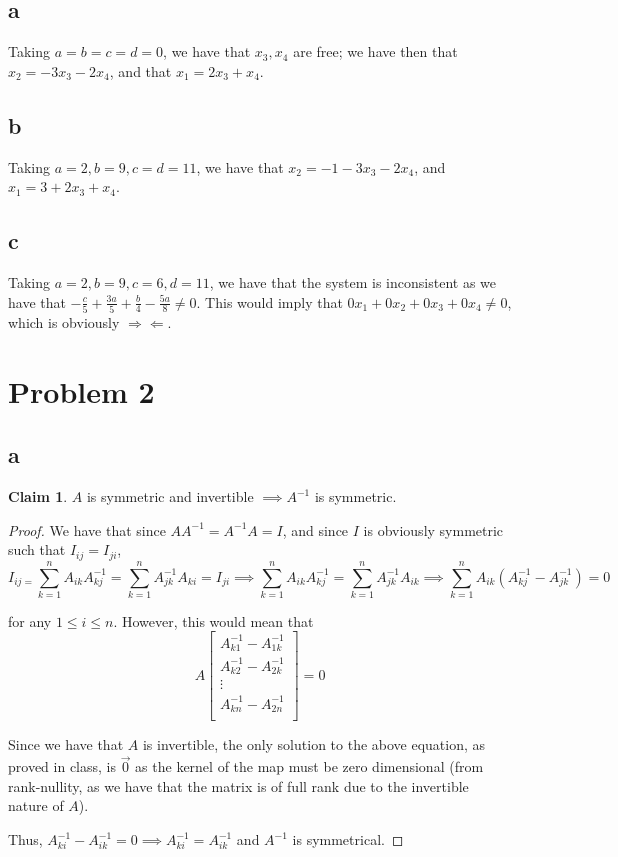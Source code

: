 \documentclass[12pt,letterpaper]{article}
\theoremstyle{definition}
\newtheorem*{claim}{Claim}
\newcommand{\contra}{\Rightarrow\!\Leftarrow}
\begin{document}
\subsection*{a}

Taking $a = b = c = d = 0$, we have that $x_3, x_4$ are free; we have then that
$x_2 = -3x_3 - 2x_4$, and that $x_1 = 2x_3 + x_4$.

\subsection*{b}

Taking $a = 2, b = 9, c = d = 11$, we have that $x_2 = -1 - 3x_3 - 2x_4$, and
$x_1 = 3 + 2x_3 + x_4$.

\subsection*{c}

Taking $a = 2, b = 9, c = 6, d = 11$, we have that the system is inconsistent as
we have that $-\frac{c}{5} + \frac{3a}{5} + \frac{b}{4} - \frac{5a}{8} \neq 0$.
This would imply that $0x_1 + 0x_2 + 0x_3 + 0x_4 \neq 0$, which is obviously $\contra$.

\section*{Problem 2}

\subsection*{a}

\begin{claim}
  $A$ is symmetric and invertible $\implies A^{-1}$ is symmetric. 
\end{claim}

\begin{proof}
  We have that since $AA^{-1} = A^{-1}A = I$, and since $I$ is obviously
  symmetric such that $I_{ij} = I_{ji}$,
  \[
    I_{ij = }\sum_{k=1}^nA_{ik}A^{-1}_{kj} = \sum_{k=1}^nA^{-1}_{jk}A_{ki} = I_{ji} \implies
    \sum_{k=1}^nA_{ik}A^{-1}_{kj} = \sum_{k=1}^nA^{-1}_{jk}A_{ik} \implies
    \sum_{k=1}^nA_{ik}(A^{-1}_{kj} - A^{-1}_{jk}) = 0
  \]

  for any $1 \leq i \leq n$. However, this would mean that
  \[
    A\begin{bmatrix}
      A^{-1}_{k1} - A^{-1}_{1k} \\
      A^{-1}_{k2} - A^{-1}_{2k} \\
      \vdots \\
      A^{-1}_{kn} - A^{-1}_{2n} \\
    \end{bmatrix} = 0
  \]

  Since we have that $A$ is invertible, the only solution to the above equation,
  as proved in class, is $\vec{0}$ as the kernel of the map must be zero
  dimensional (from rank-nullity, as we have that the matrix is of full rank due
  to the invertible nature of $A$).

  Thus, $A^{-1}_{ki} - A^{-1}_{ik} = 0 \implies A^{-1}_{ki} = A^{-1}_{ik}$ and
  $A^{-1}$ is symmetrical.
\end{proof}
\end{document}

